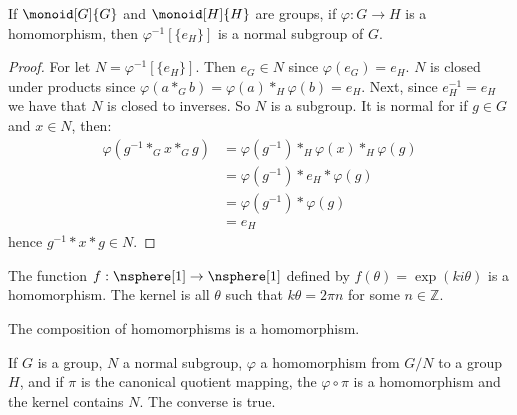             \begin{theorem}
                If $\monoid[G]{G}$ and $\monoid[H]{H}$ are groups, if
                $\varphi:G\rightarrow{H}$ is a homomorphism, then
                $\varphi^{\minus{1}}[\{e_{H}\}]$ is a normal subgroup of
                $G$.
            \end{theorem}
            \begin{proof}
                For let $N=\varphi^{\minus{1}}[\{e_{H}\}]$. Then
                $e_{G}\in{N}$ since $\varphi(e_{G})=e_{H}$. $N$ is closed
                under products since
                $\varphi(a*_{G}b)=\varphi(a)*_{H}\varphi(b)=e_{H}$. Next,
                since $e_{H}^{\minus{1}}=e_{H}$ we have that $N$ is closed
                to inverses. So $N$ is a subgroup. It is normal for if
                $g\in{G}$ and $x\in{N}$, then:
                \begin{subequations}
                    \begin{align}
                        \varphi(g^{\minus{1}}*_{G}x*_{G}g)
                        &=\varphi(g^{\minus{1}})*_{H}
                            \varphi(x)*_{H}\varphi(g)\\
                        &=\varphi(g^{\minus{1}})*e_{H}*\varphi(g)\\
                        &=\varphi(g^{\minus{1}})*\varphi(g)\\
                        &=e_{H}
                    \end{align}
                \end{subequations}
                hence $g^{\minus{1}}*x*g\in{N}$.
            \end{proof}
            \begin{example}
                The function $f:\nsphere[1]\rightarrow\nsphere[1]$ defined
                by $f(\theta)=\exp(ki\theta)$ is a homomorphism. The
                kernel is all $\theta$ such that $k\theta=2\pi{n}$ for some
                $n\in\mathbb{Z}$.
            \end{example}
            \begin{theorem}
                The composition of homomorphisms is a homomorphism.
            \end{theorem}
            If $G$ is a group, $N$ a normal subgroup, $\varphi$ a
            homomorphism from $G/N$ to a group $H$, and if $\pi$ is the
            canonical quotient mapping, the $\varphi\circ\pi$ is a
            homomorphism and the kernel contains $N$. The converse is true.
